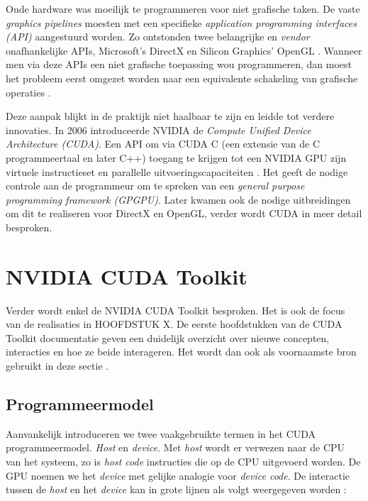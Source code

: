 Oude hardware was moeilijk te programmeren voor niet grafische taken. De vaste \textit{graphics pipelines} moesten met een specifieke \textit{application programming interfaces (API)} aangestuurd worden. Zo ontstonden twee belangrijke en \textit{vendor} onafhankelijke APIs, Microsoft's DirectX \cite{MicrosoftDX2018} en Silicon Graphics' OpenGL \cite{OpenGL2021}. Wanneer men via deze APIs een niet grafische toepassing wou programmeren, dan moest het probleem eerst omgezet worden naar een equivalente schakeling van grafische operaties \cite{Springer2013}.

Deze aanpak blijkt in de praktijk niet haalbaar te zijn en leidde tot verdere innovaties. In 2006 introduceerde NVIDIA de \textit{Compute Unified Device Architecture (CUDA)}. Een API om via CUDA C (een extensie van de C programmeertaal en later C++) toegang te krijgen tot een NVIDIA GPU zijn virtuele instructieset en parallelle uitvoeringscapaciteiten \cite{NVIDIADOC2021}\cite{Adve2012}. Het geeft de nodige controle aan de programmeur om te spreken van een \textit{general purpose programming framework (GPGPU)}. Later kwamen ook de nodige uitbreidingen om dit te realiseren voor DirectX en OpenGL, verder wordt CUDA in meer detail besproken.

\section{NVIDIA CUDA Toolkit}
\label{sec:nv_cuda_toolkit}

Verder wordt enkel de NVIDIA CUDA Toolkit besproken. Het is ook de focus van de realisaties in HOOFDSTUK X. De eerste hoofdstukken van de CUDA Toolkit documentatie geven een duidelijk overzicht over nieuwe concepten, interacties en hoe ze beide interageren. Het wordt dan ook als voornaamste bron gebruikt in deze sectie \cite{NVIDIADOC2021}.


\subsection{Programmeermodel}

Aanvankelijk introduceren we twee vaakgebruikte termen in het CUDA programmeermodel. \textit{Host} en \textit{device}. Met \textit{host} wordt er verwezen naar de CPU van het systeem, zo is \textit{host code} instructies die op de CPU uitgevoerd worden. De GPU noemen we het \textit{device} met gelijke analogie voor \textit{device code}. De interactie tussen de \textit{host} en het \textit{device} kan in grote lijnen als volgt weergegeven worden \cite{Gupta2020}:

